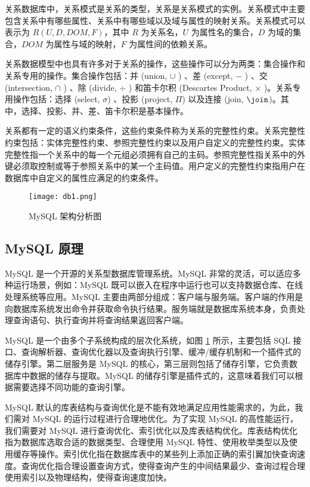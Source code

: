关系数据库中，关系模式是关系的类型，关系是关系模式的实例。关系模式中主要包含关系中有哪些属性、关系中有哪些域以及域与属性的映射关系。关系模式可以表示为 $R(U, D, DOM, F)$，其中 $R$ 为关系名，$U$ 为属性名的集合，$D$ 为域的集合，$DOM$ 为属性与域的映射，$F$ 为属性间的依赖关系。

关系数据模型中也具有许多对于关系的操作，这些操作可以分为两类：集合操作和关系专用的操作。集合操作包括：并 (union, $\cup$ ) 、差 (except, $-$ ) 、交 (intersection, $\cap$ ) 、除 (divide, $\div$ ) 和笛卡尔积 (Descartes Product, $\times$ )。关系专用操作包括：选择 (select, $\sigma$) 、投影 (project, $\Pi$) 以及连接 (join, $\join $)。其中，选择、投影、并、差、笛卡尔积是基本操作。

关系都有一定的语义约束条件，这些约束条件称为关系的完整性约束。关系完整性约束包括：实体完整性约束、参照完整性约束以及用户自定义的完整性约束。实体完整性指一个关系中的每一个元组必须拥有自己的主码。参照完整性指关系中的外键必须取控制或等于参照关系中的某一个主码值。用户定义的完整性约束指用户在数据库中自定义的属性应满足的约束条件。

\begin{figure}[!ht]
    \centering
    \texttt{[image: db1.png]}
    \caption{MySQL 架构分析图}
    \label{fig:db1}
\end{figure}

\subsection{MySQL 原理}
MySQL 是一个开源的关系型数据库管理系统。MySQL 非常的灵活，可以适应多种运行场景，例如：MySQL 既可以嵌入在程序中运行也可以支持数据仓库、在线处理系统等应用。MySQL 主要由两部分组成：客户端与服务端。客户端的作用是向数据库系统发出命令并获取命令执行结果。服务端就是数据库系统本身，负责处理查询语句、执行查询并将查询结果返回客户端。

MySQL 是一个由多个子系统构成的层次化系统，如图 \ref{fig:db1} 所示，主要包括 SQL 接口、查询解析器、查询优化器以及查询执行引擎、缓冲/缓存机制和一个插件式的储存引擎。第二层服务是 MySQL 的核心，第三层则包括了储存引擎，它负责数据库中数据的储存与提取。MySQL 的储存引擎是插件式的，这意味着我们可以根据需要选择不同功能的查询引擎。


MySQL 默认的库表结构与查询优化是不能有效地满足应用性能需求的，为此，我们需对 MySQL 的运行过程进行合理地优化。为了实现 MySQL 的高性能运行，我们需要对 MySQL 进行查询优化、索引优化以及库表结构优化。库表结构优化指为数据库选取合适的数据类型、合理使用 MySQL 特性、使用枚举类型以及使用缓存等操作。索引优化指在数据库表中的某些列上添加正确的索引翼加快查询速度。查询优化指合理设置查询方式，使得查询产生的中间结果最少、查询过程合理使用索引以及物理结构，使得查询速度加快。

